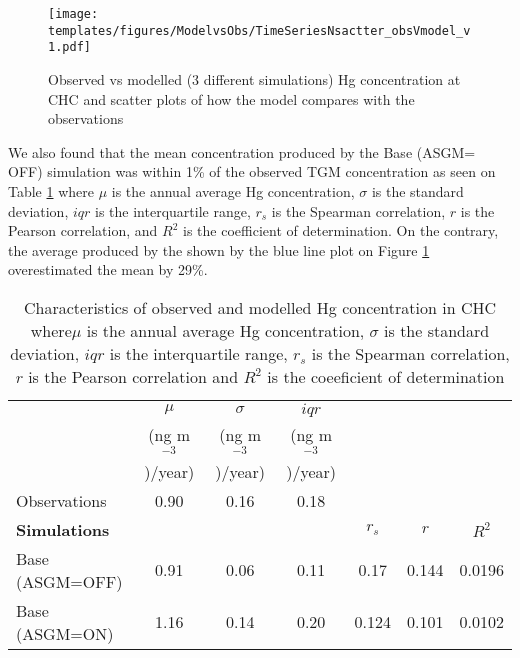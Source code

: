 \begin{figure}[H]
  \texttt{[image: templates/figures/ModelvsObs/TimeSeriesNsactter\_obsVmodel\_v1.pdf]}
  \centering
  \caption{Observed vs modelled (3 different simulations) Hg concentration at CHC and scatter plots of how the model compares with the observations  }
  \label{fig:ModelvsObsNstats}
\end{figure}
\FloatBarrier
\begin{flushleft}
We also found that the mean \hg concentration produced by the Base (ASGM= OFF) simulation was within 1\% of the observed TGM concentration as seen on Table \ref{tab:ModelvsObsStats} where $\mu$ is the annual average Hg concentration, $\sigma$ is the standard deviation, $iqr$ is the interquartile range, $r_s$ is the Spearman correlation, $r$ is the Pearson correlation, and $R^2$ is the coefficient of determination. On the contrary, the average \hg produced by the \on shown by the blue line plot on Figure \ref{fig:ModelvsObsNstats} overestimated the mean by 29\%.
 
\end{flushleft}
\setlength{\tabcolsep}{2.5pt}
\begin{table}[H]
  \begin{center}
    \caption{Characteristics of observed and modelled Hg concentration in CHC where$\mu$ is the annual average Hg concentration, $\sigma$ is the standard deviation, $iqr$ is the interquartile range, $r_s$ is the Spearman correlation, $r$ is the Pearson correlation and $R^2$ is the coeeficient of determination}
    \label{tab:ModelvsObsStats}
    \begin{tabular}{lcccccc}
      
                          & $\mu$                 & $\sigma$            & $iqr$               & & & \\
                          &  (ng m$^{-3}$)/year)  & (ng m$^{-3}$)/year) & (ng m$^{-3}$)/year) & & & \\
     \cmidrule{2-4}
     Observations         & 0.90             & 0.16            & 0.18        &  & & \\
     \textbf{Simulations} &                  &                  &               &\textbf{$r_s$} &\textbf{$r$} &\textbf{$R^2$}\\ %
      \hline
      Base (ASGM=OFF)     & 0.91             & 0.06            & 0.11         & 0.17         & 0.144      & 0.0196\\ 
      Base (ASGM=ON)      & 1.16            & 0.14            & 0.20        & 0.124         & 0.101       & 0.0102\\ %
    \end{tabular}
  \end{center}
\end{table}
\FloatBarrier

